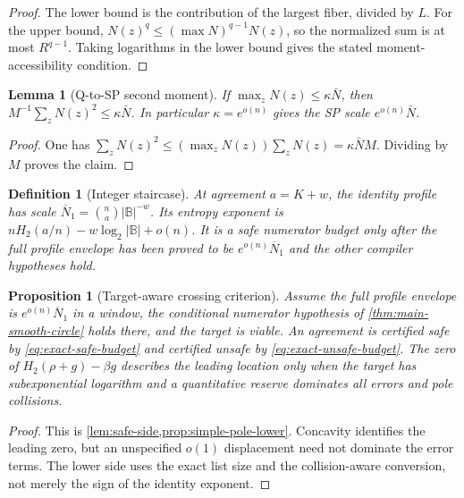 \documentclass[12pt,a4paper]{amsart}
\numberwithin{equation}{section}
\newtheorem{proposition}[proposition]{Proposition}
\newtheorem{lemma}[lemma]{Lemma}
\newtheorem{definition}[definition]{Definition}
\theoremstyle{remark}
\newcommand{\B}{\mathbb B}
\newcommand{\barN}{\overline N}
\newcommand{\Hb}{H_2}
\newcommand{\abs}[1]{\lvert #1\rvert}
\begin{document}
\begin{proof}
The lower bound is the contribution of the largest fiber, divided by
\(L\).  For the upper bound,
\(N(z)^q\le(\max N)^{q-1}N(z)\), so the normalized sum is at most
\(R^{q-1}\).  Taking logarithms in the lower bound gives the stated
moment-accessibility condition.
\end{proof}

\begin{lemma}[Q-to-SP second moment]\label{lem:q-to-sp-detail}
If \(\max_z N(z)\le \kappa\bar N\), then \(M^{-1}\sum_zN(z)^2\le\kappa\bar N\).  In particular \(\kappa=e^{o(n)}\) gives the SP scale \(e^{o(n)}\bar N\).
\end{lemma}

\begin{proof}
One has \(\sum_zN(z)^2\le(\max_zN(z))\sum_zN(z)=\kappa\bar N M\).  Dividing by \(M\) proves the claim.
\end{proof}

\begin{definition}[Integer staircase]\label{def:integer-staircase-detail}
At agreement \(a=K+w\), the identity profile has scale
\(\barN_1=\binom na\abs\B^{-w}\).  Its entropy exponent is
\(n\Hb(a/n)-w\log_2\abs\B+o(n)\).  It is a safe numerator budget only
after the full profile envelope has been proved to be
\(e^{o(n)}\barN_1\) and the other compiler hypotheses hold.
\end{definition}

\begin{proposition}[Target-aware crossing criterion]\label{prop:entropy-crossing-detail}
Assume the full profile envelope is \(e^{o(n)}\barN_1\) in a window,
the conditional numerator hypothesis of
\cref{thm:main-smooth-circle} holds there, and the target
is viable.  An agreement is certified safe by
\eqref{eq:exact-safe-budget} and certified unsafe by
\eqref{eq:exact-unsafe-budget}.  The zero of
\(\Hb(\rho+g)-\beta g\) describes the leading location only when the
target has subexponential logarithm and a quantitative reserve dominates
all errors and pole collisions.
\end{proposition}

\begin{proof}
This is \cref{lem:safe-side,prop:simple-pole-lower}.  Concavity identifies
the leading zero, but an unspecified \(o(1)\) displacement need not
dominate the error terms.  The lower side uses the exact list size and the
collision-aware conversion, not merely the sign of the identity exponent.
\end{proof}
\end{document}
